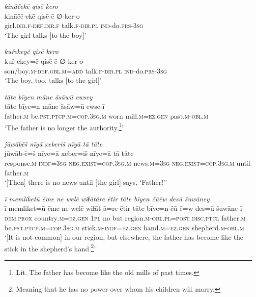 \ea \label{RE.31}
\textit{kināčekē qisē kero} \\ 
\gll kināčē-ekē qisē-ē ∅-ker-o \\ 
 girl\textsc{.dir}\textsc{.f}\textsc{-def}\textsc{.dir}\textsc{.f} talk\textsc{.f}\textsc{-dir}\textsc{.pl} \textsc{ind-}do\textsc{.prs}\textsc{-3sg} \\ 
\glt `The girl talks [to the boy]'
\z 
 
\ea \label{RE.32}
\textit{kuřekeyč qisē kero} \\ 
\gll kuř-ekey=č qisē-ē ∅-ker-o \\ 
 son/boy\textsc{.m}\textsc{-def}\textsc{.obl}\textsc{.m}\textsc{=add} talk\textsc{.f}\textsc{-dir}\textsc{.pl} \textsc{ind-}do\textsc{.prs}\textsc{-3sg} \\ 
\glt `The boy, too, talks [to the girl]'
\z 
 
\ea \label{RE.33}
\textit{tāte bīyen māne āsāwū ewsey} \\ 
\gll tāte bīye=n māne āsāw=ū ewse-ī \\ 
 father\textsc{.m} be\textsc{.pst}\textsc{.ptcp}\textsc{.m}\textsc{=cop}\textsc{.3sg}\textsc{.m} worn mill\textsc{.m}\textsc{=ez.gen} past\textsc{.m}\textsc{-obl}\textsc{.m} \\ 
\glt `The father is no longer the authority.\footnote{Lit. The father has become like the old mills of past times.}'
\z 
 
\ea \label{RE.34}
\textit{jūwābēš nīyā xeberiš nīyā tā tāte} \\ 
\gll jūwāb-ē=š nīye=ā xeber=iš nīye=ā tā tāte \\ 
 response\textsc{.m}\textsc{-indf}\textsc{=3sg} \textsc{\textsc{neg.}exist}\textsc{=cop}\textsc{.3sg}\textsc{.m} news\textsc{.m}\textsc{=3sg} \textsc{\textsc{neg.}exist}\textsc{=cop}\textsc{.3sg}\textsc{.m} until father\textsc{.m} \\ 
\glt `[Then] there is no news until [the girl] says, ‘Father!’'
\z 
 
\ea \label{RE.41}
\textit{ī memliketū ēme ne welē wiɫātāre ētir tāte bīyen čūēw desū šuwāney} \\ 
\gll ī memliket=ū ēme ne welē wiɫāt-ā=re ētir tāte bīye=n čū-ē=w des=ū šuwāne-ī \\ 
 \textsc{dem.prox} country\textsc{.m}\textsc{=ez.gen} \textsc{1pl} no but region\textsc{.m}\textsc{-obl}\textsc{.pl}\textsc{=\textsc{post}} \textsc{disc.ptcl} father\textsc{.m} be\textsc{.pst}\textsc{.ptcp}\textsc{.m}\textsc{=cop}\textsc{.3sg}\textsc{.m} stick\textsc{.m}\textsc{-indf}\textsc{=ez.gen} hand\textsc{.m}\textsc{=ez.gen} shepherd\textsc{.m}\textsc{-obl}\textsc{.m} \\ 
\glt `[It is not common] in our region, but elsewhere, the father has become like the stick in the shepherd’s hand.\footnote{Meaning that he has no power over whom his children will marry.}'
\z 
 

